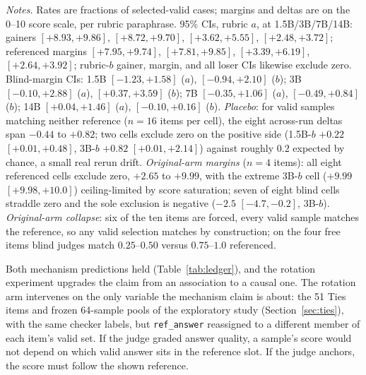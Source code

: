 \documentclass[11pt]{article}
\begin{document}
\begin{table}[tbp]
\medskip
\begin{minipage}{0.97\textwidth}
\footnotesize
\emph{Notes.}
Rates are fractions of selected-valid cases; margins and deltas are on the 0--10 score scale, per rubric paraphrase.
95\% CIs, rubric $a$, at 1.5B/3B/7B/14B: gainers $[+8.93, +9.86]$, $[+8.72, +9.70]$, $[+3.62, +5.55]$, $[+2.48, +3.72]$; referenced margins $[+7.95, +9.74]$, $[+7.81, +9.85]$, $[+3.39, +6.19]$, $[+2.64, +3.92]$; rubric-$b$ gainer, margin, and all loser CIs likewise exclude zero.
Blind-margin CIs: 1.5B $[-1.23, +1.58]$ ($a$), $[-0.94, +2.10]$ ($b$); 3B $[-0.10, +2.88]$ ($a$), $[+0.37, +3.59]$ ($b$); 7B $[-0.35, +1.06]$ ($a$), $[-0.49, +0.84]$ ($b$); 14B $[+0.04, +1.46]$ ($a$), $[-0.10, +0.16]$ ($b$).
\emph{Placebo}: for valid samples matching neither reference ($n{=}16$ items per cell), the eight across-run deltas span $-0.44$ to $+0.82$; two cells exclude zero on the positive side (1.5B-$b$ $+0.22$ $[+0.01, +0.48]$, 3B-$b$ $+0.82$ $[+0.01, +2.14]$) against roughly $0.2$ expected by chance, a small real rerun drift.
\emph{Original-arm margins} ($n{=}4$ items): all eight referenced cells exclude zero, $+2.65$ to $+9.99$, with the extreme 3B-$b$ cell ($+9.99$ $[+9.98, +10.0]$) ceiling-limited by score saturation; seven of eight blind cells straddle zero and the sole exclusion is negative ($-2.5$ $[-4.7, -0.2]$, 3B-$b$).
\emph{Original-arm collapse}: six of the ten items are forced, every valid sample matches the reference, so any valid selection matches by construction; on the four free items blind judges match $0.25$--$0.50$ versus $0.75$--$1.0$ referenced.
\end{minipage}
\caption{\textbf{Takeaway: the identical sample text gains up to $+9.5$ of 10 points when the rotated reference matches it, samples matching the displaced reference lose a roughly symmetric amount, blind margins on the same split are mostly null, and whenever a matching answer is on offer the referenced judge selects it nearly always.}}
\label{tab:rot}
\end{table}

Both mechanism predictions held (Table~\ref{tab:ledger}), and the rotation experiment upgrades the claim from an association to a causal one.
The rotation arm intervenes on the only variable the mechanism claim is about: the 51 Ties items and frozen 64-sample pools of the exploratory study (Section~\ref{sec:ties}), with the same checker labels, but \texttt{ref\_answer} reassigned to a different member of each item's valid set.
If the judge graded answer quality, a sample's score would not depend on which valid answer sits in the reference slot.
If the judge anchors, the score must follow the shown reference.
\end{document}
